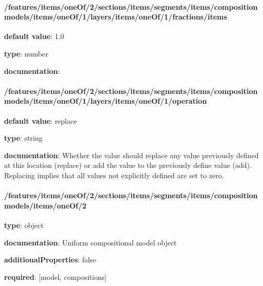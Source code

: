 \begin{itemized}
\paragraph{/features/items/oneOf/2/sections/items/segments/items/composition models/items/oneOf/1/layers/items/oneOf/1/fractions/items} \begin{itemized}
\item {\bf default value}: 1.0
\item {\bf type}: number
\item {\bf documentation}: 
\end{itemized}\end{itemized}\paragraph{/features/items/oneOf/2/sections/items/segments/items/composition models/items/oneOf/1/layers/items/oneOf/1/operation} \begin{itemized}
\item {\bf default value}: replace
\item {\bf type}: string
\item {\bf documentation}: Whether the value should replace any value previously defined at this location (replace) or add the value to the previously define value (add). Replacing implies that all values not explicitly defined are set to zero.
\end{itemized}\paragraph{/features/items/oneOf/2/sections/items/segments/items/composition models/items/oneOf/2} \begin{itemized}
\item {\bf type}: object
\item {\bf documentation}: Uniform compositional model object
\item {\bf additionalProperties}: false
\item {\bf required}: [model, compositions]\end{itemized}
